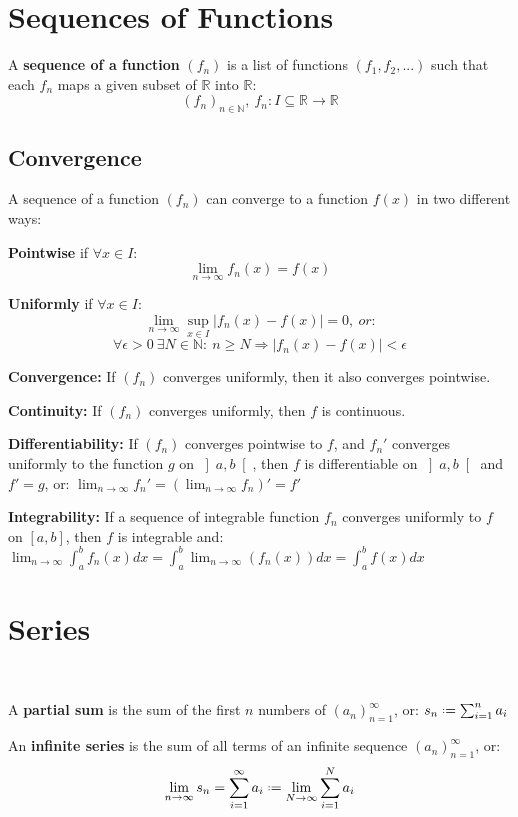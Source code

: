 \documentclass[8pt,a4paper]{extarticle}     %
\theoremstyle{definition}
\theoremstyle{definition}
\theoremstyle{definition}
\newcommand{\R}{\mathbb{R}}
\newcommand{\N}{\mathbb{N}}
\newcommand*{\defeq}{\mathrel{\vcenter{\baselineskip0.5ex \lineskiplimit0pt
            \hbox{\scriptsize.}\hbox{\scriptsize.}}}%
            =}
\begin{document}
\begin{multicols}{4}
\vfill\null 
\columnbreak
\section{Sequences of Functions}
\begin{boxdefinition}
	A \textbf{sequence of a function} $(f_n)$ is a list of functions $(f_1,f_2,...)$ such that each $f_n$ maps a given subset of $\R$ into $\R$:
	$$(f_n)_{n\in\N},\ f_n:I\subseteq\R\longrightarrow\R$$
\end{boxdefinition}
\subsection{Convergence}
\begin{boxdefinition}
	A sequence of a function $(f_n)$ can converge to a function $f(x)$ in two different ways: 
	\begin{bulletlist}
		\item \textbf{Pointwise} if $\forall x\in I $: 
		$$\lim_{n\to\infty} f_n(x)=f(x)$$
		\item \textbf{Uniformly} if $\forall x\in I $: 
		$$\lim_{n\to\infty}\sup_{x\in I} |f_n(x)-f(x)| = 0,\ \textit{or:}$$ 
		$$\forall \epsilon > 0 \ \exists N\in\N:\ n\geq N \Rightarrow |f_n(x)-f(x)| < \epsilon $$
	\end{bulletlist}
\end{boxdefinition}
\begin{eqlist}
	\item \textbf{Convergence:} If $(f_n)$ converges uniformly, then it also converges pointwise.
	\item \textbf{Continuity:} If $(f_n)$ converges uniformly, then $f$ is continuous.
	\item \textbf{Differentiability:} If $(f_n)$ converges pointwise to $f$, and $f_n'$ converges uniformly to the function $g$ on $\left]a,b\right[$, then $f$ is differentiable on $\left]a,b\right[$ and $f'=g$, or: 	$\lim_{n\to\infty}f_n'=\left(\lim_{n\to\infty}f_n\right)'=f'$
	\item \textbf{Integrability:} If a sequence of integrable function $f_n$ converges uniformly to $f$ on $[a,b]$, then $f$ is integrable and: \\
	$\lim_{n\to\infty}\int_a^b f_n(x)dx = \int_a^b \lim_{n\to\infty}\left(f_n(x)\right)dx = \int_a^b f(x)dx$
\end{eqlist}
\vfill\eject
\columnbreak

\section{Series}
\begin{boxdefinition}\
	\begin{bulletlist}
		\item A \textbf{partial sum} is the sum of the first $n$ numbers of $(a_n)_{n=1}^\infty$, or: 
		$s_n \defeq \sum_{i=1}^n a_i$
		\item An \textbf{infinite series} is the sum of all terms of an infinite sequence $(a_n)_{n=1}^\infty$, or: 
		$$\lim_{n\to\infty}s_n = \sum_{i=1}^\infty a_i \defeq \lim_{N\to\infty}\sum_{i=1}^N a_i$$
	\end{bulletlist}
\end{boxdefinition}

\end{multicols}
\end{document}
